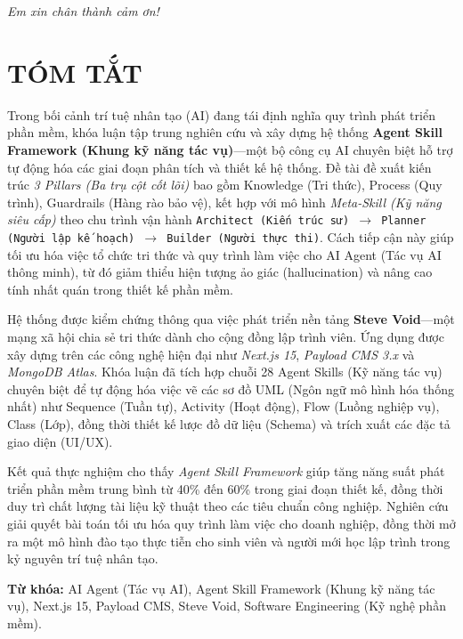 \documentclass[13pt,a4paper,oneside]{extreport}
\numberwithin{equation}{chapter}
\numberwithin{figure}{chapter}
\numberwithin{table}{chapter}
\begin{document}
\begin{flushright}
  \textit{Em xin chân thành cảm ơn!}
\end{flushright}


\clearpage
\chapter*{TÓM TẮT}
Trong bối cảnh trí tuệ nhân tạo (AI) đang tái định nghĩa quy trình phát triển phần mềm, khóa luận tập trung nghiên cứu và xây dựng hệ thống \textbf{Agent Skill Framework (Khung kỹ năng tác vụ)}—một bộ công cụ AI chuyên biệt hỗ trợ tự động hóa các giai đoạn phân tích và thiết kế hệ thống. Đề tài đề xuất kiến trúc \textit{3 Pillars (Ba trụ cột cốt lõi)} bao gồm Knowledge (Tri thức), Process (Quy trình), Guardrails (Hàng rào bảo vệ), kết hợp với mô hình \textit{Meta-Skill (Kỹ năng siêu cấp)} theo chu trình vận hành \texttt{Architect (Kiến trúc sư) $\rightarrow$ Planner (Người lập kế hoạch) $\rightarrow$ Builder (Người thực thi)}. Cách tiếp cận này giúp tối ưu hóa việc tổ chức tri thức và quy trình làm việc cho AI Agent (Tác vụ AI thông minh), từ đó giảm thiểu hiện tượng ảo giác (hallucination) và nâng cao tính nhất quán trong thiết kế phần mềm.

Hệ thống được kiểm chứng thông qua việc phát triển nền tảng \textbf{Steve Void}—một mạng xã hội chia sẻ tri thức dành cho cộng đồng lập trình viên. Ứng dụng được xây dựng trên các công nghệ hiện đại như \textit{Next.js 15}, \textit{Payload CMS 3.x} và \textit{MongoDB Atlas}. Khóa luận đã tích hợp chuỗi 28 Agent Skills (Kỹ năng tác vụ) chuyên biệt để tự động hóa việc vẽ các sơ đồ UML (Ngôn ngữ mô hình hóa thống nhất) như Sequence (Tuần tự), Activity (Hoạt động), Flow (Luồng nghiệp vụ), Class (Lớp), đồng thời thiết kế lược đồ dữ liệu (Schema) và trích xuất các đặc tả giao diện (UI/UX).

Kết quả thực nghiệm cho thấy \textit{Agent Skill Framework} giúp tăng năng suất phát triển phần mềm trung bình từ 40\% đến 60\% trong giai đoạn thiết kế, đồng thời duy trì chất lượng tài liệu kỹ thuật theo các tiêu chuẩn công nghiệp. Nghiên cứu giải quyết bài toán tối ưu hóa quy trình làm việc cho doanh nghiệp, đồng thời mở ra một mô hình đào tạo thực tiễn cho sinh viên và người mới học lập trình trong kỷ nguyên trí tuệ nhân tạo.

\textbf{Từ khóa:} AI Agent (Tác vụ AI), Agent Skill Framework (Khung kỹ năng tác vụ), Next.js 15, Payload CMS, Steve Void, Software Engineering (Kỹ nghệ phần mềm).
\end{document}
